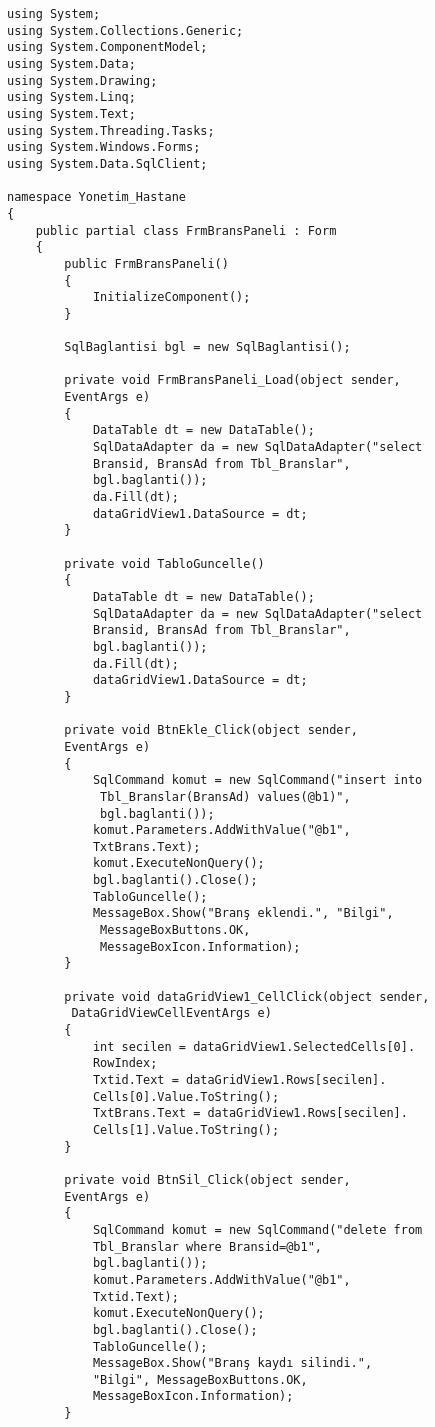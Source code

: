 \begin{lstlisting}
using System;
using System.Collections.Generic;
using System.ComponentModel;
using System.Data;
using System.Drawing;
using System.Linq;
using System.Text;
using System.Threading.Tasks;
using System.Windows.Forms;
using System.Data.SqlClient;

namespace Yonetim_Hastane
{
    public partial class FrmBransPaneli : Form
    {
        public FrmBransPaneli()
        {
            InitializeComponent();
        }

        SqlBaglantisi bgl = new SqlBaglantisi();

        private void FrmBransPaneli_Load(object sender, 
        EventArgs e)
        {
            DataTable dt = new DataTable();
            SqlDataAdapter da = new SqlDataAdapter("select 
            Bransid, BransAd from Tbl_Branslar", 
            bgl.baglanti());
            da.Fill(dt);
            dataGridView1.DataSource = dt;
        }

        private void TabloGuncelle()
        {
            DataTable dt = new DataTable();
            SqlDataAdapter da = new SqlDataAdapter("select 
            Bransid, BransAd from Tbl_Branslar", 
            bgl.baglanti());
            da.Fill(dt);
            dataGridView1.DataSource = dt;
        }

        private void BtnEkle_Click(object sender, 
        EventArgs e)
        {
            SqlCommand komut = new SqlCommand("insert into
             Tbl_Branslar(BransAd) values(@b1)", 
             bgl.baglanti());
            komut.Parameters.AddWithValue("@b1", 
            TxtBrans.Text);
            komut.ExecuteNonQuery();
            bgl.baglanti().Close();
            TabloGuncelle();
            MessageBox.Show("Branş eklendi.", "Bilgi",
             MessageBoxButtons.OK, 
             MessageBoxIcon.Information); 
        }

        private void dataGridView1_CellClick(object sender,
         DataGridViewCellEventArgs e)
        {
            int secilen = dataGridView1.SelectedCells[0].
            RowIndex;
            Txtid.Text = dataGridView1.Rows[secilen].
            Cells[0].Value.ToString();
            TxtBrans.Text = dataGridView1.Rows[secilen].
            Cells[1].Value.ToString();
        }

        private void BtnSil_Click(object sender, 
        EventArgs e)
        {
            SqlCommand komut = new SqlCommand("delete from 
            Tbl_Branslar where Bransid=@b1", 
            bgl.baglanti());
            komut.Parameters.AddWithValue("@b1", 
            Txtid.Text);
            komut.ExecuteNonQuery();
            bgl.baglanti().Close();
            TabloGuncelle();
            MessageBox.Show("Branş kaydı silindi.", 
            "Bilgi", MessageBoxButtons.OK, 
            MessageBoxIcon.Information);   
        }


\end{lstlisting}
